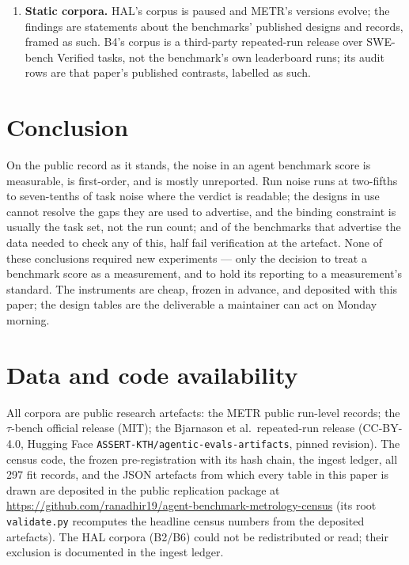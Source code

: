 \documentclass[11pt]{article}
\begin{document}
\begin{enumerate}
in substance, but exact bit-reproduction of the Arm B fits from the
deposited record is not guaranteed. (ii) Arm A reports BCa intervals
where the registration specifies percentile bootstrap (declared in
Section 3.3; verdicts identical under both). (iii) The SUPPORTED /
INDETERMINATE row labels rest on a reporting taxonomy (the interval
must lie entirely inside $(0, 1)$) that is not itself in the frozen
registration, which freezes only the set-level falsifier; the taxonomy
was applied consistently to all six arm--benchmark rows, and the
set-level falsifier reading --- no benchmark refutes the thesis ---
does not depend on it.
\item \textbf{Static corpora.} HAL's corpus is paused and METR's
versions evolve; the findings are statements about the benchmarks'
published designs and records, framed as such. B4's corpus is a
third-party repeated-run release over SWE-bench Verified tasks, not
the benchmark's own leaderboard runs; its audit rows are that paper's
published contrasts, labelled as such.
\end{enumerate}

\section{Conclusion}

On the public record as it stands, the noise in an agent benchmark
score is measurable, is first-order, and is mostly unreported. Run
noise runs at two-fifths to seven-tenths of task noise where the
verdict is readable; the designs in use cannot resolve the gaps they
are used to advertise, and the binding constraint is usually the task
set, not the run count; and of the benchmarks that advertise the data
needed to check any of this, half fail verification at the artefact.
None of these conclusions required new experiments --- only the
decision to treat a benchmark score as a measurement, and to hold its
reporting to a measurement's standard. The instruments are cheap,
frozen in advance, and deposited with this paper; the design tables
are the deliverable a maintainer can act on Monday morning.

\section*{Data and code availability}

All corpora are public research artefacts: the METR public run-level
records; the $\tau$-bench official release (MIT); the Bjarnason et
al.\ repeated-run release (CC-BY-4.0, Hugging Face
\texttt{ASSERT-KTH/agentic-evals-artifacts}, pinned revision). The
census code, the frozen pre-registration with its hash chain, the
ingest ledger, all 297 fit records, and the JSON artefacts from which
every table in this paper is drawn are deposited in the public
replication package at
\url{https://github.com/ranadhir19/agent-benchmark-metrology-census}
(its root \texttt{validate.py} recomputes the headline census numbers
from the deposited artefacts). The HAL corpora (B2/B6) could not be
redistributed or read; their exclusion is documented in the ingest
ledger.
\end{document}
